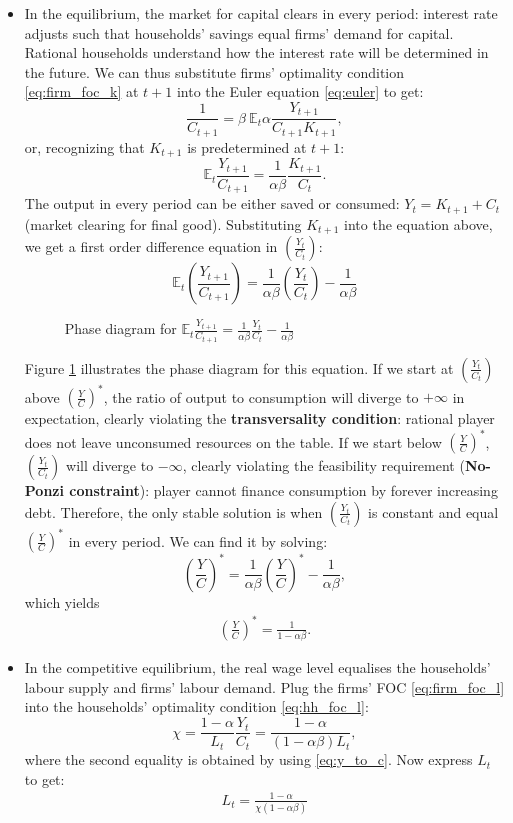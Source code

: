 \documentclass[authoryear,11pt]{elsarticle}
\begin{document}
\begin{itemize}
	\item In the equilibrium, the market for capital clears in every period: interest rate adjusts such that households' savings equal firms' demand for capital. Rational households understand how the interest rate will be determined in the future. We can thus substitute firms' optimality condition \eqref{eq:firm_foc_k} at $t+1$ into the Euler equation \eqref{eq:euler} to get:
	\[
		\frac{1}{C_{t+1}} = \beta \ \mathbb{E}_t\alpha\frac{Y_{t+1}}{C_{t+1}K_{t+1}},
	\]
	or, recognizing that $K_{t+1}$ is predetermined at $t+1$:
	\[
		\mathbb{E}_t \frac{Y_{t+1}}{C_{t+1}} = \frac{1}{\alpha\beta}\frac{K_{t+1}}{C_t} .
	\]
	The output in every period can be either saved or consumed: $Y_t=K_{t+1}+C_t$ (market clearing for final good). Substituting $K_{t+1}$ into the equation above, we get a first order difference equation in $\left(\frac{Y_t}{C_t}\right)$:
	\[
		\mathbb{E}_t \left(\frac{Y_{t+1}}{C_{t+1}}\right) = \frac{1}{\alpha\beta}\left(\frac{Y_{t}}{C_t}\right)  - \frac{1}{\alpha\beta}
	\]
	\begin{figure}[!htb]
		\caption{\label{fig:phase_diag} Phase diagram for $\mathbb{E}_t \frac{Y_{t+1}}{C_{t+1}} = \frac{1}{\alpha\beta}\frac{Y_{t}}{C_t}  - \frac{1}{\alpha\beta}$}
	\end{figure}
	Figure \ref{fig:phase_diag} illustrates the phase diagram for this equation. If we start at $\left(\frac{Y_{t}}{C_t}\right)$ above $\left(\frac{Y}{C}\right)^*$, the ratio of output to consumption will diverge to $+\infty$ in expectation, clearly violating the \textbf{transversality condition}: rational player does not leave unconsumed resources on the table. If we start below $\left(\frac{Y}{C}\right)^*$, $\left(\frac{Y_{t}}{C_t}\right)$ will diverge to $-\infty$, clearly violating the feasibility requirement (\textbf{No-Ponzi constraint}): player cannot finance consumption by forever increasing debt. Therefore, the only stable solution is when $\left(\frac{Y_{t}}{C_t}\right)$ is constant and equal $\left(\frac{Y}{C}\right)^*$ in every period. We can find it by solving:
	\[
		\left(\frac{Y}{C}\right)^* = \frac{1}{\alpha\beta}\left(\frac{Y}{C}\right)^*  - \frac{1}{\alpha\beta},
	\]
	which yields
	\begin{gather}
		\left(\frac{Y}{C}\right)^* = \frac{1}{1-\alpha \beta}.
		\label{eq:y_to_c}
	\end{gather}
	
	\item In the competitive equilibrium, the real wage level equalises the households' labour supply and firms' labour demand. Plug the firms' FOC \eqref{eq:firm_foc_l} into the households' optimality condition \eqref{eq:hh_foc_l}:
	\[
		\chi = \frac{1-\alpha}{L_t} \frac{Y_t}{C_t} = \frac{1-\alpha}{(1-\alpha\beta)L_t},
	\]
	where the second equality is obtained by using \eqref{eq:y_to_c}. Now express $L_t$ to get:
	\begin{gather}
		L_t = \frac{1-\alpha}{\chi(1-\alpha\beta)}
		\label{eq:eq_labour}
	\end{gather}
	

\end{itemize}
\end{document}
